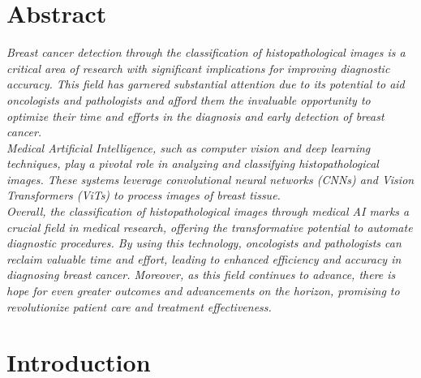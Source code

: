 \documentclass[
11pt, %
english, %
singlespacing, %
headsepline, %
]{project_structure}
\begin{document}
{
\hypersetup{linkcolor=black}
\listoftables
}

\printglossaries

\newpage
\section*{Abstract}
\textit{Breast cancer detection through the classification of histopathological images is a critical area of research with significant implications for improving diagnostic accuracy. This field has garnered substantial attention due to its potential to aid oncologists and pathologists and afford them the invaluable opportunity to optimize their time and efforts in the diagnosis and early detection of breast cancer.}\\

\noindent \textit{Medical Artificial Intelligence, such as computer vision and deep learning techniques, play a pivotal role in analyzing and classifying histopathological images. These systems leverage convolutional neural networks (\acrshort{CNN}s) and Vision Transformers (\acrshort{ViT}s) to process images of breast tissue.}\\

\noindent \textit{Overall, the classification of histopathological images through medical AI marks a crucial field in medical research, offering the transformative potential to automate diagnostic procedures. By using this technology, oncologists and pathologists can reclaim valuable time and effort, leading to enhanced efficiency and accuracy in diagnosing breast cancer. Moreover, as this field continues to advance, there is hope for even greater outcomes and advancements on the horizon, promising to revolutionize patient care and treatment effectiveness.}

\section{Introduction}
\end{document}
